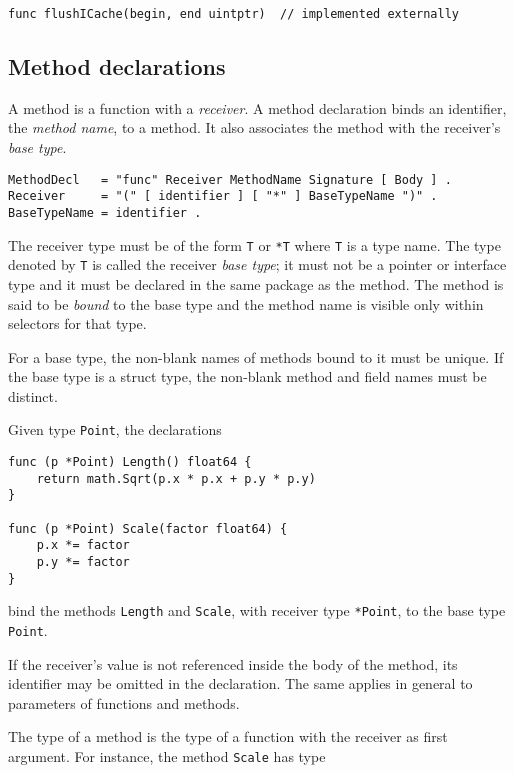 {\begin{Verbatim}[frame=single]
func flushICache(begin, end uintptr)  // implemented externally
\end{Verbatim}

\subsection*{Method declarations}

A method is a function with a \emph{receiver}. A method declaration
binds an identifier, the \emph{method name}, to a method. It also
associates the method with the receiver's \emph{base type}.

\begin{Verbatim}[frame=single]
MethodDecl   = "func" Receiver MethodName Signature [ Body ] .
Receiver     = "(" [ identifier ] [ "*" ] BaseTypeName ")" .
BaseTypeName = identifier .
\end{Verbatim}

The receiver type must be of the form \texttt{T} or \texttt{*T} where
\texttt{T} is a type name. The type denoted by \texttt{T} is called the
receiver \emph{base type}; it must not be a pointer or interface type
and it must be declared in the same package as the method. The method is
said to be \emph{bound} to the base type and the method name is visible
only within selectors for that type.

For a base type, the non-blank names of
methods bound to it must be
unique. If the base type is a
struct type, the non-blank method and field
names must be distinct.

Given type \texttt{Point}, the declarations

\begin{Verbatim}[frame=single]
func (p *Point) Length() float64 {
    return math.Sqrt(p.x * p.x + p.y * p.y)
}

func (p *Point) Scale(factor float64) {
    p.x *= factor
    p.y *= factor
}
\end{Verbatim}

bind the methods \texttt{Length} and \texttt{Scale}, with receiver type
\texttt{*Point}, to the base type \texttt{Point}.

If the receiver's value is not referenced inside the body of the method,
its identifier may be omitted in the declaration. The same applies in
general to parameters of functions and methods.

The type of a method is the type of a function with the receiver as
first argument. For instance, the method \texttt{Scale} has type

}
